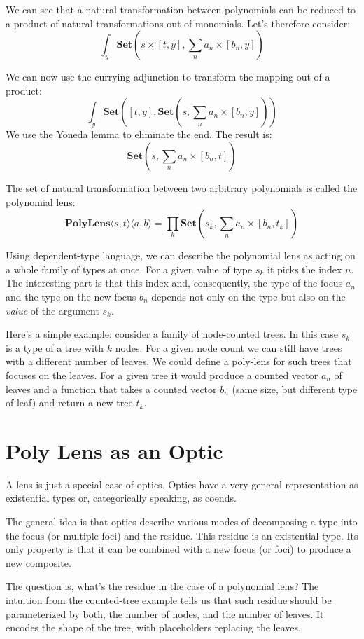 \documentclass[11pt]{amsart}
\begin{document}
We can see that a natural transformation between polynomials can be reduced to a product of natural transformations out of monomials. Let's therefore consider:
\[ \int_y \mathbf{Set} \left( s \times [t, y], \sum_n a_n \times [b_n, y]\right) \]
 
 We can now use the currying adjunction to transform the mapping out of a product:
\[ \int_y \mathbf{Set} \left( 
    [t, y],  \mathbf{Set}\left(s, \sum_n a_n \times [b_n, y]\right)  \right) \]
 We use the Yoneda lemma to eliminate the end. The result is:
 \[ \mathbf{Set}\left(s, \sum_n a_n \times [b_n, t] \right) \]
 
The set of natural transformation between two arbitrary polynomials is called the polynomial lens:
 \[ \mathbf{PolyLens}\langle s, t\rangle \langle a, b\rangle = \prod_k \mathbf{Set}\left(s_k, \sum_n a_n \times [b_n, t_k] \right) \]

Using dependent-type language, we can describe the polynomial lens as acting on a whole family of types at once. For a given value of type $s_k$ it picks the index $n$. The interesting part is that this index and, consequently, the type of the focus $a_n$ and the type on the new focus $b_n$ depends not only on the type but also on the \emph{value} of the argument $s_k$. 

Here's a simple example: consider a family of node-counted trees. In this case $s_k$ is a type of a tree with $k$ nodes. For a given node count we can still have trees with a different number of leaves. We could define a poly-lens for such trees that focuses on the leaves. For a given tree it would produce a counted vector $a_n$ of leaves and a function that takes a counted vector $b_n$  (same size, but different type of leaf) and return a new tree $t_k$. 

\section{Poly Lens as an Optic}

A lens is just a special case of optics. Optics have a very general representation as existential types or, categorically speaking, as coends. 

The general idea is that optics describe various modes of decomposing a type into the focus (or multiple foci) and the residue. This residue is an existential type. Its only property is that it can be combined with a new focus (or foci) to produce a new composite.

The question is, what's the residue in the case of a polynomial lens? The intuition from the counted-tree example tells us that such residue should be parameterized by both, the number of nodes, and the number of leaves. It encodes the shape of the tree, with placeholders replacing the leaves. 
\end{document}
